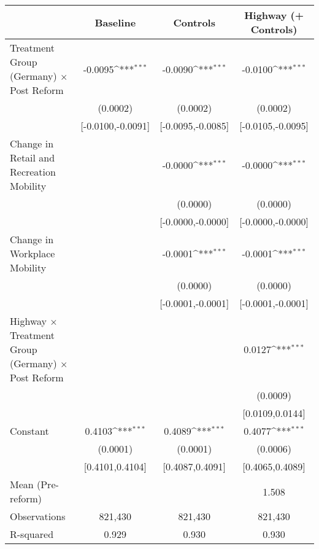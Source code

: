 {
\def\sym#1{\ifmmode^{#1}\else\(^{#1}\)\fi}
\begin{tabular}{l*{3}{c}}
\toprule
                    &\multicolumn{1}{c}{Baseline}&\multicolumn{1}{c}{Controls}&\multicolumn{1}{c}{Highway (+ Controls)}\\
\midrule
Treatment Group (Germany) $\times$ Post Reform&     -0.0095\sym{***}&     -0.0090\sym{***}&     -0.0100\sym{***}\\
                    &    (0.0002)         &    (0.0002)         &    (0.0002)         \\
                    &[-0.0100,-0.0091]         &[-0.0095,-0.0085]         &[-0.0105,-0.0095]         \\
Change in Retail and Recreation Mobility&                     &     -0.0000\sym{***}&     -0.0000\sym{***}\\
                    &                     &    (0.0000)         &    (0.0000)         \\
                    &                     &[-0.0000,-0.0000]         &[-0.0000,-0.0000]         \\
Change in Workplace Mobility&                     &     -0.0001\sym{***}&     -0.0001\sym{***}\\
                    &                     &    (0.0000)         &    (0.0000)         \\
                    &                     &[-0.0001,-0.0001]         &[-0.0001,-0.0001]         \\
Highway $\times$ Treatment Group (Germany) $\times$ Post Reform&                     &                     &      0.0127\sym{***}\\
                    &                     &                     &    (0.0009)         \\
                    &                     &                     &[0.0109,0.0144]         \\
Constant            &      0.4103\sym{***}&      0.4089\sym{***}&      0.4077\sym{***}\\
                    &    (0.0001)         &    (0.0001)         &    (0.0006)         \\
                    &[0.4101,0.4104]         &[0.4087,0.4091]         &[0.4065,0.4089]         \\
\midrule
Mean (Pre-reform)   &                     &                     &       1.508         \\
Observations        &     821,430         &     821,430         &     821,430         \\
R-squared           &       0.929         &       0.930         &       0.930         \\
\bottomrule
\end{tabular}
}
